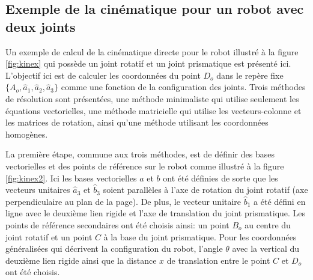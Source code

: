 

\subsection{Exemple de la cinématique pour un robot avec deux joints}

Un exemple de calcul de la cinématique directe pour le robot illustré à la figure \ref{fig:kinex} qui possède un joint rotatif et un joint prismatique est présenté ici. L'objectif ici est de calculer les coordonnées du point $D_o$ dans le repère fixe $\{ A_o, \hat{a}_1, \hat{a}_2, \hat{a}_3\}$ comme une fonction de la configuration des joints. Trois méthodes de résolution sont présentées, une méthode minimaliste qui utilise seulement les équations vectorielles, une méthode matricielle qui utilise les vecteurs-colonne et les matrices de rotation, ainsi qu'une méthode utilisant les coordonnées homogènes.

La première étape, commune aux trois méthodes, est de définir des bases vectorielles et des points de référence sur le robot comme illustré à la figure \ref{fig:kinex2}. Ici les bases vectorielles $a$ et $b$ ont été définies de sorte que les vecteurs unitaires $\hat{a}_3$ et $\hat{b}_3$ soient parallèles à l'axe de rotation du joint rotatif (axe perpendiculaire au plan de la page). De plus, le vecteur unitaire $\hat{b}_1$ a été défini en ligne avec le deuxième lien rigide et l'axe de translation du joint prismatique. Les points de référence secondaires ont été choisis ainsi: un point $B_o$ au centre du joint rotatif et un point $C$ à la base du joint prismatique. Pour les coordonnées généralisées qui décrivent la configuration du robot,
l'angle $\theta$ avec la vertical du deuxième lien rigide ainsi que la distance $x$ de translation entre le point $C$ et $D_o$ ont été choisis.

